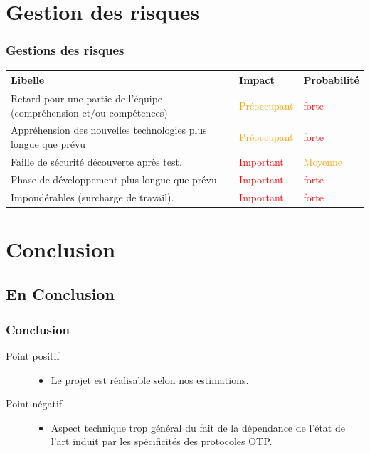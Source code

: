 \documentclass[xcolor=table]{beamer}
\begin{document}
\section{Gestion des risques}

\begin{frame}[fragile]
\frametitle{Gestions des risques}
  \begin{center}
  \begin{tabular}{| p{5cm} | p{2cm} |p{2cm} |}
  \hline
  \rowcolor{lightgray}Libelle & Impact & Probabilité\\ \hline
  Retard pour une partie de l'équipe (compréhension et/ou compétences) & \textcolor{orange}{Préoccupant} & \textcolor{red}{forte}\\ \hline
  Appréhension des nouvelles technologies plus longue que prévu & \textcolor{orange}{Préoccupant} & \textcolor{red}{forte}\\ \hline
  Faille de sécurité découverte après test. & \textcolor{red}{Important} & \textcolor{orange}{Moyenne}\\ \hline
  Phase de développement plus longue que prévu.& \textcolor{red}{Important} & \textcolor{red}{forte}\\ \hline
  Impondérables (surcharge de travail).& \textcolor{red}{Important} & \textcolor{red}{forte}\\ \hline
  \end{tabular}
  \end{center}
\end{frame}

\section{Conclusion}
\subsection{En Conclusion}

\begin{frame}
\frametitle{Conclusion}
\begin{description}
 \item[Point positif]
  \begin{itemize}
   \item Le projet est réalisable selon nos estimations.
  \end{itemize}

 \item[Point négatif]
 \begin{itemize}
  \item Aspect technique trop général du fait de la dépendance de l'état de l'art induit par les spécificités des protocoles OTP.
 \end{itemize}
\end{description}
\end{frame}
\end{document}
